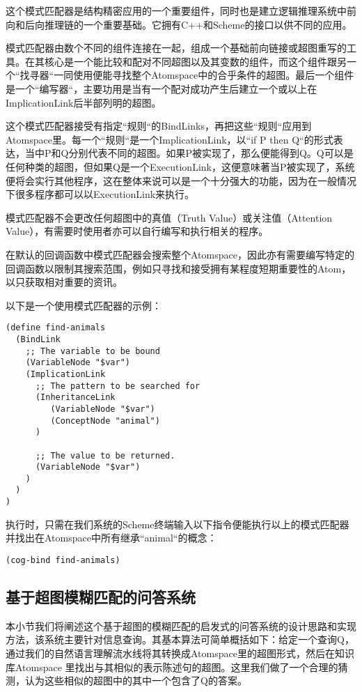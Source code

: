这个模式匹配器是结构精密应用的一个重要组件，同时也是建立逻辑推理系统中前向和后向推理链的一个重要基础。它拥有C++和Scheme的接口以供不同的应用。

模式匹配器由数个不同的组件连接在一起，组成一个基础前向链接或超图重写的工具。在其核心是一个能比较和配对不同超图以及其变数的组件，而这个组件跟另一个“找寻器“一同使用便能寻找整个Atomspace中的合乎条件的超图。最后一个组件是一个“编写器“，主要功用是当有一个配对成功产生后建立一个或以上在ImplicationLink后半部列明的超图。

这个模式匹配器接受有指定“规则“的BindLinks，再把这些“规则“应用到Atomspace里。每一个“规则“是一个ImplicationLink，以“if P then Q“的形式表达，当中P和Q分别代表不同的超图。如果P被实现了，那么便能得到Q。Q可以是任何种类的超图，但如果Q是一个ExecutionLink，这便意味著当P被实现了，系统便将会实行其他程序，这在整体来说可以是一个十分强大的功能，因为在一般情况下很多程序都可以以ExecutionLink来执行。

模式匹配器不会更改任何超图中的真值（Truth Value）或关注值（Attention Value），有需要时使用者亦可以自行编写和执行相关的程序。

在默认的回调函数中模式匹配器会搜索整个Atomspace，因此亦有需要编写特定的回调函数以限制其搜索范围，例如只寻找和接受拥有某程度短期重要性的Atom，以只获取相对重要的资讯。

以下是一个使用模式匹配器的示例：

\begin{verbatim}
(define find-animals
  (BindLink
    ;; The variable to be bound
    (VariableNode "$var")
    (ImplicationLink
      ;; The pattern to be searched for
      (InheritanceLink
         (VariableNode "$var")
         (ConceptNode "animal")
      )
 
      ;; The value to be returned.
      (VariableNode "$var")
    )
  )
)
 \end{verbatim}
 
执行时，只需在我们系统的Scheme终端输入以下指令便能执行以上的模式匹配器并找出在Atomspace中所有继承“animal“的概念：

\begin{verbatim}
(cog-bind find-animals)
\end{verbatim}

\subsection{基于超图模糊匹配的问答系统}

本小节我们将阐述这个基于超图的模糊匹配的启发式的问答系统的设计思路和实现方法，该系统主要针对信息查询。其基本算法可简单概括如下：给定一个查询Q，通过我们的自然语言理解流水线将其转换成Atomspace里的超图形式，然后在知识库Atomspace 里找出与其相似的表示陈述句的超图。这里我们做了一个合理的猜测，认为这些相似的超图中的其中一个包含了Q的答案。


